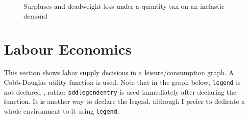 \documentclass[english]{article}
\begin{document}
\begin{figure}[H]
\begin{center}
\end{center}
\caption[Quantity tax on an inelastic demand]{Surpluses and deadweight loss under a quantity tax on an inelastic demand}
\end{figure}
	
\section{Labour Economics}
This section shows labor supply decisions in a leisure/consumption graph. A Cobb-Douglas utility function is used. Note that in the graph below, \texttt{legend}	is not declared , rather \texttt{addlegendentry} is used immediately after declaring the function. It is another way to declare the legend, although I prefer to dedicate a whole environment to it using \texttt{legend}.
\end{document}
